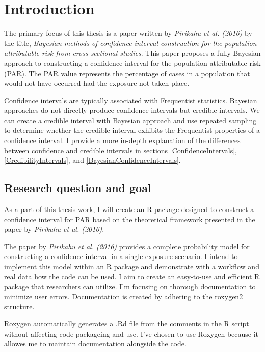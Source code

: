\chapter{Introduction} \label{sec:Intro}

The primary focus of this thesis is a paper written by \textit{Pirikahu et al. (2016)} by the title, \textit{Bayesian methods of confidence interval construction for the population attributable risk from cross-sectional studies}. This paper proposes a fully Bayesian approach to constructing a confidence interval for the population-attributable risk (PAR). The PAR value represents the percentage of cases in a population that would not have occurred had the exposure not taken place.\cite{Pirikahu2016BayesianMO}

Confidence intervals are typically associated with Frequentist statistics. Bayesian approaches do not directly produce confidence intervals but credible intervals. We can create a credible interval with Bayesian approach and use repeated sampling to determine whether the credible interval exhibits the Frequentist properties of a confidence interval. I provide a more in-depth explanation of the differences between confidence and credible intervals in sections \ref{ConfidenceIntervals}, \ref{CredibilityIntervals}, and \ref{BayesianConfidenceIntervals}.

\section{Research question and goal} \label{sec:Task}

As a part of this thesis work, I will create an R package designed to construct a confidence interval for PAR based on the theoretical framework presented in the paper by \textit{Pirikahu et al. (2016)}. 

The paper by \textit{Pirikahu et al. (2016)} provides a complete probability model for constructing a confidence interval in a single exposure scenario. I intend to implement this model within an R package and demonstrate with a workflow and real data how the code can be used. I aim to create an easy-to-use and efficient R package that researchers can utilize. I'm focusing on thorough documentation to minimize user errors. Documentation is created by adhering to the roxygen2 structure.

Roxygen automatically generates a .Rd file from the comments in the R script without affecting code packageing and use.\cite{roxygen2} I've chosen to use Roxygen because it allowes me to maintain documentation alongside the code.

